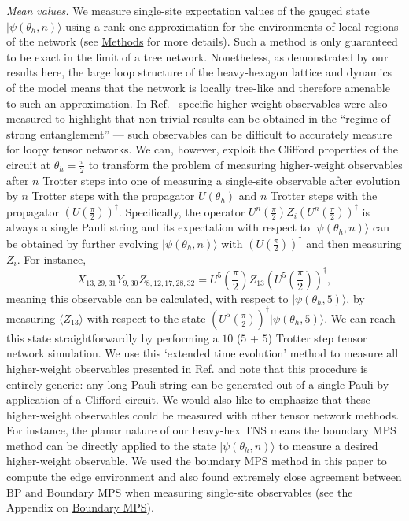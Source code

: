 \documentclass[%
 superscriptaddress,
 amsmath,amssymb,
 prx, nofootinbib,
]{revtex4-2}
\begin{document}
\emph{Mean values.} We measure single-site expectation values of the gauged state $\vert \psi(\theta_{h}, n) \rangle$ using a rank-one approximation for the environments of local regions of the network (see \hyperref[Sec:Methods]{Methods} for more details). Such a method is only guaranteed to be exact in the limit of a tree network. Nonetheless, as demonstrated by our results here, the large loop structure of the 
heavy-hexagon lattice and dynamics of the model means that the network is locally tree-like and therefore amenable to such an approximation. In Ref.~\cite{kim2023} specific higher-weight observables were also measured to highlight that non-trivial results can be obtained in the ``regime of strong entanglement'' --- such observables can be difficult to accurately measure for loopy tensor networks. 
We can, however, exploit the Clifford properties of the circuit at $\theta_{h} = \frac{\pi}{2}$ to transform the problem of measuring higher-weight observables after $n$ Trotter steps into one of measuring a single-site observable after evolution by $n$ Trotter steps with the propagator $U(\theta_{h})$ and $n$ Trotter steps with the propagator $\left(U(\frac{\pi}{2})\right)^{\dagger}$. 
Specifically, the operator $U^{n}\left(\frac{\pi}{2}\right)Z_{i}\left(U^{n}\left(\frac{\pi}{2}\right)\right)^{\dagger}$ is always a single Pauli string and its expectation with respect to $\vert \psi(\theta_{h}, n) \rangle$ can be obtained by further evolving $\vert \psi(\theta_{h}, n) \rangle$ with $\left(U(\frac{\pi}{2})\right)^{\dagger}$ and then measuring $Z_{i}$. For instance,
\begin{equation}
    X_{13, 29, 31}Y_{9,30}Z_{8,12,17,28,32} =  U^{5}\left(\frac{\pi}{2}\right)Z_{13}\left(U^{5}\left(\frac{\pi}{2}\right)\right)^{\dagger},
\end{equation} 
meaning this observable can be calculated, with respect to $\vert \psi(\theta_h,5) \rangle$, by measuring $\langle Z_{13} \rangle$ with respect to the state $\left( U^{5}\left(\frac{\pi}{2}\right)\right)^{\dagger}\vert \psi(\theta_h,5) \rangle$. We can reach this state straightforwardly by performing a $10$ ($5$ + $5$) Trotter step tensor network simulation. We use this `extended time evolution' method to measure all higher-weight observables presented in Ref. \cite{kim2023} and note that this procedure is entirely generic: any long Pauli string can be generated out of a single Pauli by application of a Clifford circuit. We would also like to emphasize that these higher-weight observables could be measured with other tensor network methods. For instance, the planar nature of our heavy-hex TNS means the boundary MPS \cite{Verstraete2004} method can be directly applied to the state $|\psi(\theta_h,n) \rangle$ to measure a desired higher-weight observable. We used the boundary MPS method in this paper to compute the edge environment and also found extremely close agreement between BP and Boundary MPS when measuring single-site observables (see the Appendix on \hyperref[Subsec:BoundaryMPS]{Boundary MPS}).
\end{document}
